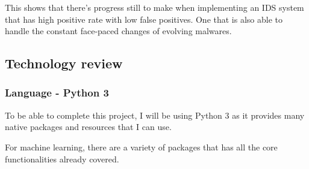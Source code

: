 \documentclass[11pt]{article}
\begin{document}
This shows that there’s progress still to make when implementing an IDS system that has high positive rate with low false positives. One that is also able to handle the constant face-paced changes of evolving malwares.

\subsection{Technology review}
\subsubsection{Language - Python 3}
To be able to complete this project, I will be using Python 3 as it provides many native packages and resources that I can use.

For machine learning, there are a variety of packages that has all the core functionalities already covered.
\end{document}
